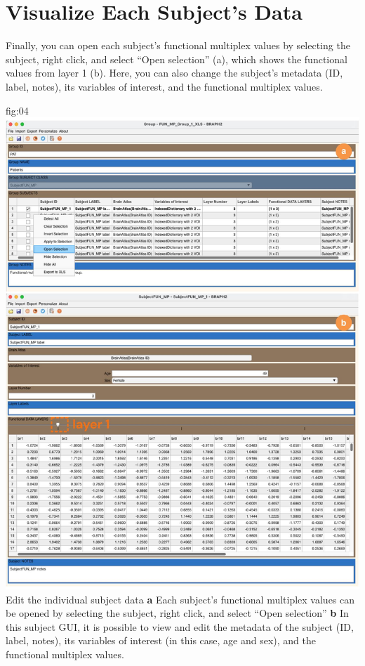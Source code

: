 \documentclass[justified]{tufte-handout}
\begin{document}

\section{Visualize Each Subject's Data}

Finally, you can open each subject's functional multiplex values by selecting the subject, right click, and select ``Open selection'' (a), which shows the functional values from layer 1 (b). Here, you can also change the subject's metadata (ID, label, notes), its variables of interest, and the functional multiplex values.

	{fig:04}
	{\includegraphics{fig04.jpg}
	}
	{Edit the individual subject data}
	{
	{\bf a}  Each subject's functional multiplex values can be opened by selecting the subject, right click, and select ``Open selection''
	{\bf b} In this subject GUI, it is possible to view and edit the metadata of the subject (ID, label, notes), its variables of interest (in this case, age and sex), and the functional multiplex values. 
	}
\end{document}
